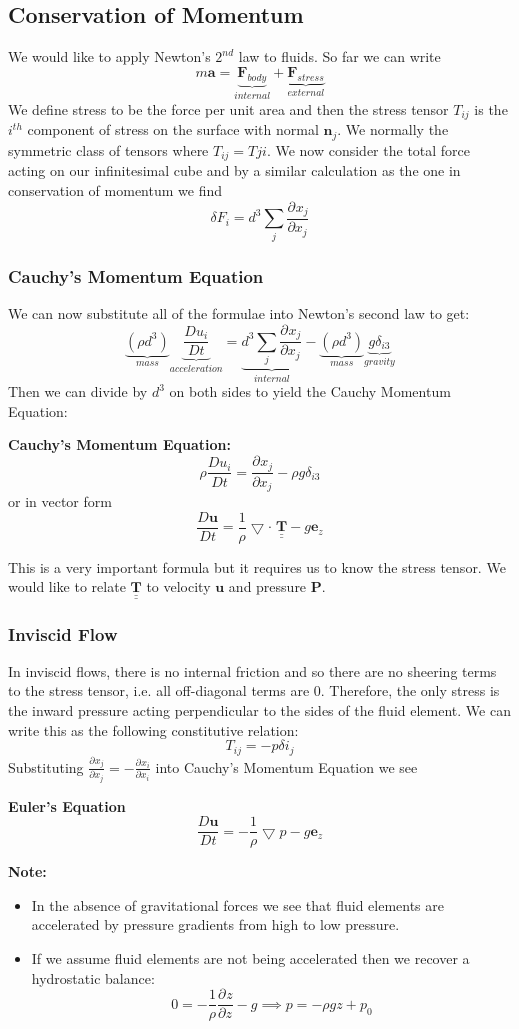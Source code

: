 \documentclass[11pt]{article}
\newcommand*{\pd}[3][]{\ensuremath{\frac{\partial^{#1} {#3}}{\partial {#3}^{#1}}}}
\newcommand*{\md}[1]{\ensuremath{\frac{D #1}{D t}}}
\newcommand{\grad}{\bigtriangledown}
\newcommand{\tul}[1]{\underline{\underline{#1}}}
\newenvironment{note}
    {\textbf{Note:}\begin{mdframed}[backgroundcolor=white, roundcorner=5pt, linewidth=0pt]}
    {\end{mdframed}}
\newenvironment{formula}
	{\begin{mdframed}[backgroundcolor=white, roundcorner=5pt, linewidth=1pt, linecolor=red]}
	{\end{mdframed}}
\newcommand{\mv}[1]{\textbf{#1}}
\newcommand{\mdf}[1]{{\color{red}#1}}
\begin{document}
\subsection{Conservation of Momentum}
We would like to apply Newton's $2^{nd}$ law to fluids. So far we can write
$$m\mv{a}=\underbrace{ \mv{F}_{body} }_{internal}+\underbrace{\mv{F}_{stress}}_{external}$$
We define \mdf{stress} to be the force per unit area and then the \mdf{stress tensor} $T_{ij}$  is the $i^{th}$ component of stress on the surface with normal $\mv{n}_j$.
We normally the symmetric class of tensors where $T_{ij}=T{ji}$.
We now consider the total force acting on our infinitesimal cube and by a similar calculation as the one in conservation of momentum we find
$$\delta F_i=d^3\sum_j\pd{T_{ij}}{x_j}$$
\subsubsection{Cauchy's Momentum Equation}
We can now substitute all of the formulae into Newton's second law to get:
$$\underbrace{ (\rho d^3) }_{mass}\underbrace{ \md{u_i} }_{acceleration}=\underbrace{d^3\sum_j\pd{T_{ij}}{x_j}}_{internal} -\underbrace{(\rho d^3)}_{mass}\underbrace{g\delta_{i3}}_{gravity}$$
Then we can divide by $d^3$ on both sides to yield the Cauchy Momentum Equation:
\begin{formula}
\textbf{Cauchy's Momentum Equation:}
$$\rho\md{u_i}=\pd{T_{ij}}{x_j}-\rho g \delta_{i3}$$
or in vector form
$$\md{\mv{u}}=\frac{1}{\rho}\grad\cdot\;\tul{\mv{T}}-g\mv{e}_z$$
\end{formula}
This is a very important formula but it requires us to know the stress tensor. We would like to relate $\tul{\mv{T}}$ to velocity $\mv{u}$ and pressure $\mv{P}$. 
\subsubsection{Inviscid Flow}
In inviscid flows, there is no internal friction and so there are no sheering terms to the stress tensor, i.e. all off-diagonal terms are 0.
Therefore, the only stress is the inward pressure acting perpendicular to the sides of the fluid element.
We can write this as the following \mdf{constitutive relation}:
$$T_{ij}=-p\delta{i_j}$$
Substituting $\pd{T_{ij}}{x_j}=-\pd{p}{x_i}$ into Cauchy's Momentum Equation we see
\begin{formula}
	\textbf{Euler's Equation}
	$$\md{\mv{u}}=-\frac{1}{\rho}\grad{p}-g\mv{e}_z$$
\end{formula}
\begin{note}
\begin{itemize}
	\item In the absence of gravitational forces we see that fluid elements are accelerated by pressure gradients from high to low pressure.
	\item If we assume fluid elements are not being accelerated then we recover a hydrostatic balance:
		$$0=-\frac{1}{\rho}\pd{p}{z}-g\implies p=-\rho gz + p_0$$
\end{itemize}
\end{note}
\end{document}

